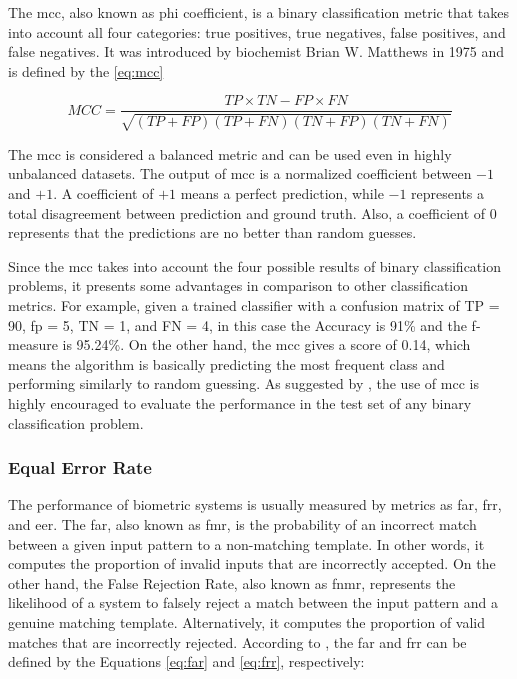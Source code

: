 The \acf{mcc}, also known as phi coefficient, is a binary classification metric that takes into account all four categories: true positives, true negatives, false positives, and false negatives. It was introduced by biochemist Brian W. Matthews in 1975 \citep{matthews1975comparison} and is defined by the \autoref{eq:mcc}

\begin{equation}
\label{eq:mcc}
MCC = \frac{TP \times TN - FP \times FN}{\sqrt{(TP + FP)(TP + FN)(TN + FP)(TN + FN)}}
\end{equation}

The \acs{mcc} is considered a balanced metric and can be used even in highly unbalanced datasets. The output of \acs{mcc} is a normalized coefficient between $-1$ and $+1$. A coefficient of $+1$ means a perfect prediction, while $-1$ represents a total disagreement between prediction and ground truth. Also, a coefficient of $0$ represents that the predictions are no better than random guesses. 

Since the \acs{mcc} takes into account the four possible results of binary classification problems, it presents some advantages in comparison to other classification metrics. For example, given a trained classifier with a confusion matrix of TP = 90, \acs{fp} = 5, TN = 1, and FN = 4, in this case the Accuracy is 91\% and the f-measure is 95.24\%. On the other hand, the \acs{mcc} gives a score of 0.14, which means the algorithm is basically predicting the most frequent class and performing similarly to random guessing. As suggested by \cite{chicco2017ten}, the use of \acs{mcc} is highly encouraged to evaluate the performance in the test set of any binary classification problem.

\subsubsection{Equal Error Rate}

The performance of biometric systems is usually measured by metrics as \acf{far}, \acf{frr}, and \acf{eer}. The \acl{far}, also known as \acf{fmr}, is the probability of an incorrect match between a given input pattern to a non-matching template. In other words, it computes the proportion of invalid inputs that are incorrectly accepted. On the other hand, the False Rejection Rate, also known as \acf{fnmr}, represents the likelihood of a system to falsely reject a match between the input pattern and a genuine matching template. Alternatively, it computes the proportion of valid matches that are incorrectly rejected. According to \cite{ross2006handbook}, the \acs{far} and \acs{frr} can be defined by the Equations \ref{eq:far} and \ref{eq:frr}, respectively:

